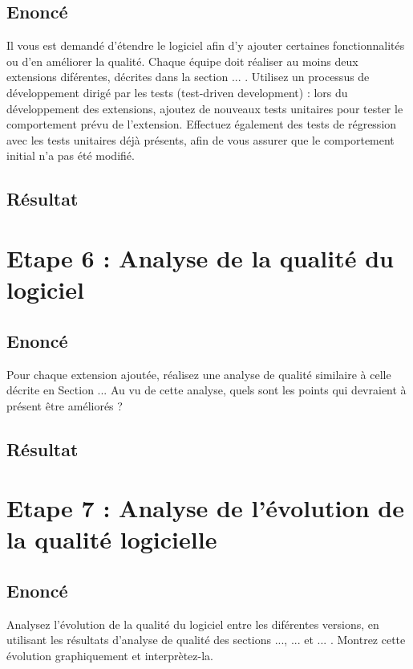 \documentclass[12pt,a4paper,final]{article}
\begin{document}
\subsection{Enoncé} 
Il vous est demandé d'étendre le logiciel afin d'y ajouter certaines fonctionnalités ou d'en améliorer la qualité. Chaque équipe doit réaliser au moins deux extensions diférentes, décrites dans la section ... .
Utilisez un processus de développement dirigé par les tests (test-driven development) : lors du développement des extensions, ajoutez de nouveaux tests unitaires pour tester le comportement prévu de l'extension. Effectuez également des tests de régression avec les tests unitaires déjà présents, afin de vous assurer que le comportement initial n'a pas été modifié.
\subsection{Résultat}



\newpage
\section{Etape 6 : Analyse de la qualité du logiciel}\label{sec:etape6}
\subsection{Enoncé} 
Pour chaque extension ajoutée, réalisez une analyse de qualité similaire à celle décrite en Section ... Au vu de cette analyse, quels sont les points qui devraient à présent être améliorés ?
\subsection{Résultat}



\newpage
\section{Etape 7 : Analyse de l'évolution de la qualité logicielle}\label{sec:etape7}
\subsection{Enoncé} 
Analysez l'évolution de la qualité du logiciel entre les diférentes versions, en utilisant les résultats d'analyse de qualité des sections ..., ... et ... . Montrez cette évolution graphiquement et interprètez-la.
\end{document}

